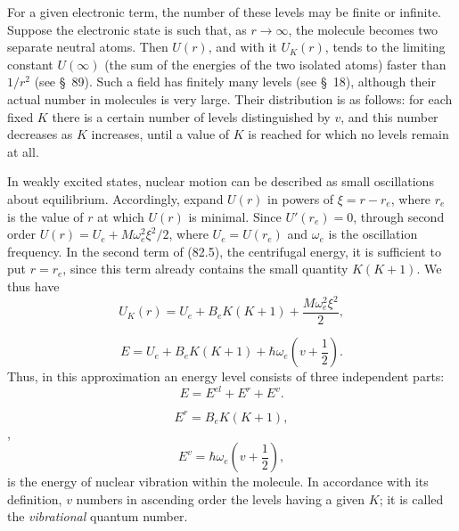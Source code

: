 For a given electronic term, the number of these levels may be finite or infinite. Suppose the electronic state is such that, as $r\to\infty$, the molecule becomes two separate neutral atoms. Then $U(r)$, and with it $U_K(r)$, tends to the limiting constant $U(\infty)$ (the sum of the energies of the two isolated atoms) faster than $1/r^2$ (see \S~89). Such a field has finitely many levels (see \S~18), although their actual number in molecules is very large. Their distribution is as follows: for each fixed $K$ there is a certain number of levels distinguished by $v$, and this number decreases as $K$ increases, until a value of $K$ is reached for which no levels remain at all.





In weakly excited states, nuclear motion can be described as small oscillations about equilibrium. Accordingly, expand $U(r)$ in powers of $\xi=r-r_e$, where $r_e$ is the value of $r$ at which $U(r)$ is minimal. Since $U'(r_e)=0$, through second order $U(r)=U_e+M\omega_e^2\xi^2/2$, where $U_e=U(r_e)$ and $\omega_e$ is the oscillation frequency. In the second term of (82.5), the centrifugal energy, it is sufficient to put $r=r_e$, since this term already contains the small quantity $K(K+1)$. We thus have
\begin{equation}U_K(r)=U_e+B_eK(K+1)+\frac{M\omega_e^2\xi^2}{2},\tag{82.7}\end{equation}




\begin{equation}E=U_e+B_eK(K+1)+\hbar\omega_e\left(v+\frac12\right).\tag{82.8}\end{equation}
Thus, in this approximation an energy level consists of three independent parts:
\begin{equation}E=E^{el}+E^r+E^v.\tag{82.9}\end{equation}

\begin{equation}E^r=B_eK(K+1),\tag{82.10}\end{equation}
%
\unskip,
\begin{equation}E^v=\hbar\omega_e\left(v+\frac12\right),\tag{82.11}\end{equation}
is the energy of nuclear vibration within the molecule. In accordance with its definition, $v$ numbers in ascending order the levels having a given $K$; it is called the \emph{vibrational} quantum number.

